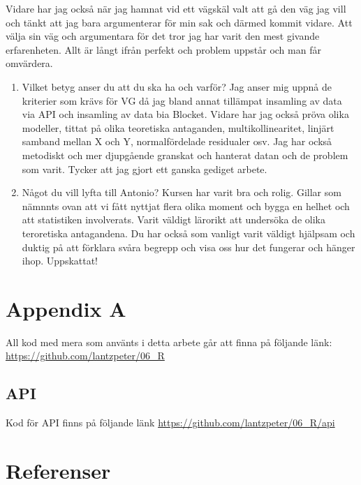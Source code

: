 \documentclass[
  letterpaper,
  DIV=11,
  numbers=noendperiod]{scrreprt}
\begin{document}
Vidare har jag också när jag hamnat vid ett vägskäl valt att gå den väg
jag vill och tänkt att jag bara argumenterar för min sak och därmed
kommit vidare. Att välja sin väg och argumentara för det tror jag har
varit den mest givande erfarenheten. Allt är långt ifrån perfekt och
problem uppstår och man får omvärdera.

\begin{enumerate}
\def\labelenumi{\arabic{enumi}.}
\setcounter{enumi}{2}
\item
  Vilket betyg anser du att du ska ha och varför? Jag anser mig uppnå de
  kriterier som krävs för VG då jag bland annat tillämpat insamling av
  data via API och insamling av data bia Blocket. Vidare har jag också
  pröva olika modeller, tittat på olika teoretiska antaganden,
  multikollinearitet, linjärt samband mellan X och Y, normalfördelade
  residualer osv. Jag har också metodiskt och mer djupgående granskat
  och hanterat datan och de problem som varit. Tycker att jag gjort ett
  ganska gediget arbete.
\item
  Något du vill lyfta till Antonio? Kursen har varit bra och rolig.
  Gillar som nämnnts ovan att vi fått nyttjat flera olika moment och
  bygga en helhet och att statistiken involverats. Varit väldigt
  lärorikt att undersöka de olika teroretiska antagandena. Du har också
  som vanligt varit väldigt hjälpsam och duktig på att förklara svåra
  begrepp och visa oss hur det fungerar och hänger ihop. Uppskattat!
\end{enumerate}


\chapter{Appendix A}\label{appendix-a}

All kod med mera som använts i detta arbete går att finna på följande
länk: \url{https://github.com/lantzpeter/06_R}

\section{API}\label{api}

Kod för API finns på följande länk
\url{https://github.com/lantzpeter/06_R/api}


\chapter{Referenser}\label{referenser}
\end{document}
